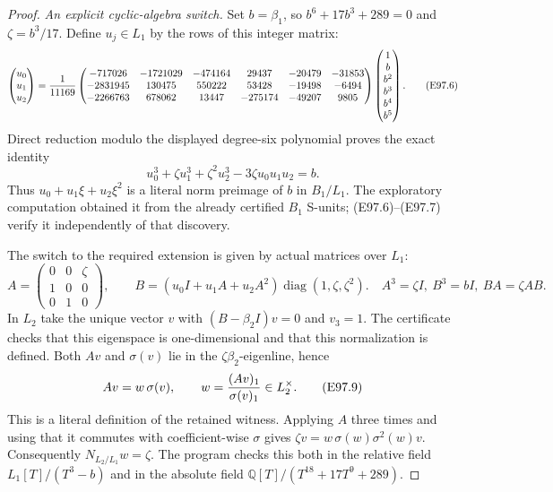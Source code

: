 \begin{proof}
\emph{An explicit cyclic-algebra switch.}
Set \(b=\beta_1\), so \(b^6+17b^3+289=0\) and
\(\zeta=b^3/17\). Define \(u_j\in L_1\) by the rows
of this integer matrix:
\[
 \begin{pmatrix}u_0\\u_1\\u_2\end{pmatrix}
 ={1\over11169}
 \begin{pmatrix}
 -717026&-1721029&-474164&29437&-20479&-31853\\
 -2831945&130475&550222&53428&-19498&-6494\\
 -2266763&678062&13447&-275174&-49207&9805
 \end{pmatrix}
 \begin{pmatrix}1\\b\\b^2\\b^3\\b^4\\b^5\end{pmatrix}.
 \tag{E97.6}
\]
Direct reduction modulo the displayed degree-six
polynomial proves the exact identity
\[
 u_0^3+\zeta u_1^3+\zeta^2u_2^3
       -3\zeta u_0u_1u_2=b.
 \tag{E97.7}
\]
Thus \(u_0+u_1\xi+u_2\xi^2\) is a literal norm
preimage of \(b\) in \(B_1/L_1\). The exploratory
computation obtained it from the already certified
\(B_1\) S-units; (E97.6)--(E97.7) verify it independently
of that discovery.

The switch to the required extension is given by actual
matrices over \(L_1\):
\[
 A=\begin{pmatrix}0&0&\zeta\\1&0&0\\0&1&0\end{pmatrix},
 \qquad
 B=(u_0I+u_1A+u_2A^2)
       \operatorname{diag}(1,\zeta,\zeta^2).
 \quad
 A^3=\zeta I,\ B^3=bI,\ BA=\zeta AB.
 \tag{E97.8}
\]
In \(L_2\) take the unique vector \(v\) with
\((B-\beta_2I)v=0\) and \(v_3=1\).
The certificate checks that this eigenspace is
one-dimensional and that this normalization is defined.
Both \(Av\) and \(\sigma(v)\) lie in the
\(\zeta\beta_2\)-eigenline, hence
\[
       Av=w\,\sigma(v),\qquad
       w={ (Av)_1\over \sigma(v)_1}\in L_2^\times .
 \tag{E97.9}
\]
This is a literal definition of the retained witness.
Applying \(A\) three times and using that it commutes
with coefficient-wise \(\sigma\) gives
\(\zeta v=w\,\sigma(w)\sigma^2(w)v\).
Consequently \(N_{L_2/L_1}w=\zeta\).
The program checks this both in the relative field
\(L_1[T]/(T^3-b)\) and in the absolute field
\(\mathbb Q[T]/(T^{18}+17T^9+289)\).


\end{proof}
